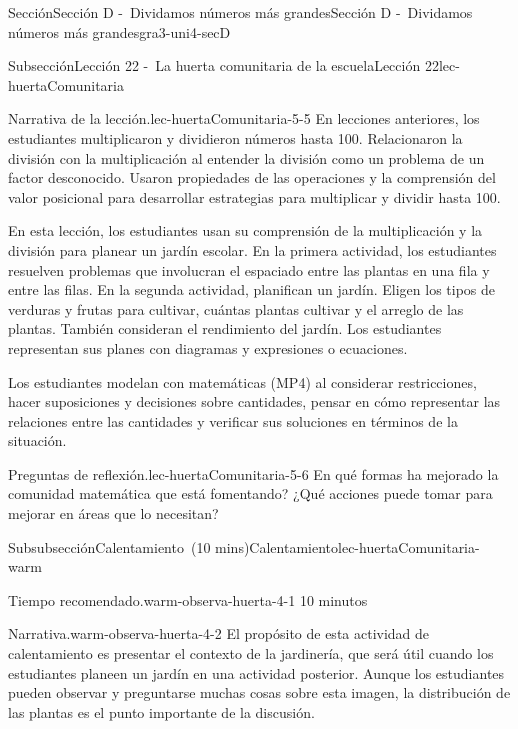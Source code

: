 \documentclass[oneside,10pt,]{article}
\begin{document}
\begin{sectionptx}{Sección}{Sección D -~Dividamos números más grandes}{}{Sección D -~Dividamos números más grandes}{}{}{gra3-uni4-secD}
\begin{subsectionptx}{Subsección}{Lección 22 -~La huerta comunitaria de la escuela}{}{Lección 22}{}{}{lec-huertaComunitaria}
\begin{introduction}{}
\begin{paragraphs}{Narrativa de la lección.}{lec-huertaComunitaria-5-5}
En lecciones anteriores, los estudiantes multiplicaron y dividieron números hasta 100. Relacionaron la división con la multiplicación al entender la división como un problema de un factor desconocido. Usaron propiedades de las operaciones y la comprensión del valor posicional para desarrollar estrategias para multiplicar y dividir hasta 100.%
\par
En esta lección, los estudiantes usan su comprensión de la multiplicación y la división para planear un jardín escolar. En la primera actividad, los estudiantes resuelven problemas que involucran el espaciado entre las plantas en una fila y entre las filas. En la segunda actividad, planifican un jardín. Eligen los tipos de verduras y frutas para cultivar, cuántas plantas cultivar y el arreglo de las plantas. También consideran el rendimiento del jardín. Los estudiantes representan sus planes con diagramas y expresiones o ecuaciones.%
\par
Los estudiantes modelan con matemáticas (MP4) al considerar restricciones, hacer suposiciones y decisiones sobre cantidades, pensar en cómo representar las relaciones entre las cantidades y verificar sus soluciones en términos de la situación.%
\end{paragraphs}%
\begin{paragraphs}{Preguntas de reflexión.}{lec-huertaComunitaria-5-6}%
En qué formas ha mejorado la comunidad matemática que está fomentando? ¿Qué acciones puede tomar para mejorar en áreas que lo necesitan?%
\end{paragraphs}%
\end{introduction}%
%
%
\typeout{************************************************}
\typeout{************************************************}
%
\begin{subsubsectionptx}{Subsubsección}{Calentamiento~(10 mins)}{}{Calentamiento}{}{}{lec-huertaComunitaria-warm}
\par
\begin{paragraphs}{Tiempo recomendado.}{warm-observa-huerta-4-1}%
10 minutos%
\end{paragraphs}%
\begin{paragraphs}{Narrativa.}{warm-observa-huerta-4-2}%
El propósito de esta actividad de calentamiento es presentar el contexto de la jardinería, que será útil cuando los estudiantes planeen un jardín en una actividad posterior. Aunque los estudiantes pueden observar y preguntarse muchas cosas sobre esta imagen, la distribución de las plantas es el punto importante de la discusión.%

\end{paragraphs}
\end{subsubsectionptx}
\end{subsectionptx}
\end{sectionptx}
\end{document}
